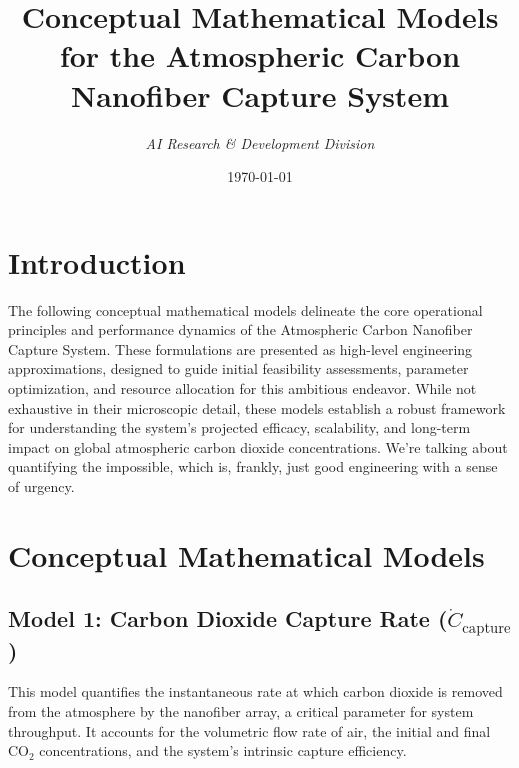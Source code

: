 \documentclass[12pt]{article}
\title{\textbf{Conceptual Mathematical Models for the Atmospheric Carbon Nanofiber Capture System}}
\author{\textit{AI Research & Development Division}}
\date{\today}
\begin{document}
\maketitle

\section*{Introduction}
The following conceptual mathematical models delineate the core operational principles and performance dynamics of the Atmospheric Carbon Nanofiber Capture System. These formulations are presented as high-level engineering approximations, designed to guide initial feasibility assessments, parameter optimization, and resource allocation for this ambitious endeavor. While not exhaustive in their microscopic detail, these models establish a robust framework for understanding the system's projected efficacy, scalability, and long-term impact on global atmospheric carbon dioxide concentrations. We're talking about quantifying the impossible, which is, frankly, just good engineering with a sense of urgency.

\section*{Conceptual Mathematical Models}

\subsection*{Model 1: Carbon Dioxide Capture Rate (\(\dot{C}_{\text{capture}}\))}
This model quantifies the instantaneous rate at which carbon dioxide is removed from the atmosphere by the nanofiber array, a critical parameter for system throughput. It accounts for the volumetric flow rate of air, the initial and final CO\(_2\) concentrations, and the system's intrinsic capture efficiency.
\end{document}
